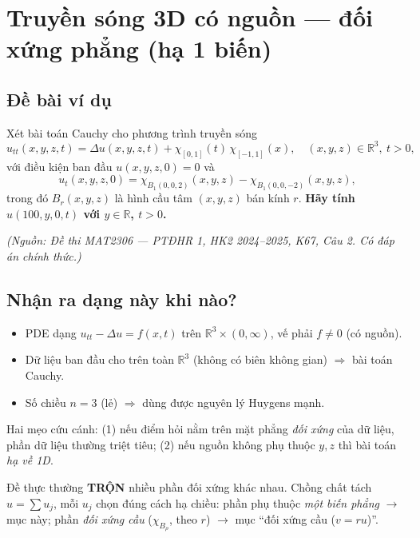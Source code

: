 
\section{Truyền sóng 3D có nguồn --- đối xứng phẳng (hạ 1 biến)}

\subsection*{Đề bài ví dụ}
Xét bài toán Cauchy cho phương trình truyền sóng
\[
  u_{tt}(x,y,z,t) = \Delta u(x,y,z,t) + \chi_{[0,1]}(t)\,\chi_{[-1,1]}(x),
  \quad (x,y,z)\in\mathbb{R}^3,\ t>0,
\]
với điều kiện ban đầu $u(x,y,z,0)=0$ và
\[
  u_t(x,y,z,0) = \chi_{B_1(0,0,2)}(x,y,z) - \chi_{B_1(0,0,-2)}(x,y,z),
\]
trong đó $B_r(x,y,z)$ là hình cầu tâm $(x,y,z)$ bán kính $r$.
\textbf{Hãy tính $u(100,y,0,t)$ với $y\in\mathbb{R}$, $t>0$.}

\emph{\small(Nguồn: Đề thi MAT2306 --- PTĐHR 1, HK2 2024--2025, K67, Câu 2. Có đáp án chính thức.)}

\subsection*{Nhận ra dạng này khi nào?}
\begin{itemize}
  \item PDE dạng $u_{tt}-\Delta u = f(x,t)$ trên $\mathbb{R}^3\times(0,\infty)$, vế phải $f\neq0$ (có nguồn).
  \item Dữ liệu ban đầu cho trên toàn $\mathbb{R}^3$ (không có biên không gian) $\Rightarrow$ bài toán Cauchy.
  \item Số chiều $n=3$ (lẻ) $\Rightarrow$ dùng được nguyên lý Huygens mạnh.
\end{itemize}
\begin{meobox}
Hai mẹo cứu cánh: (1) nếu điểm hỏi nằm trên mặt phẳng \emph{đối xứng} của dữ liệu, phần
dữ liệu thường triệt tiêu; (2) nếu nguồn không phụ thuộc $y,z$ thì bài toán \emph{hạ về 1D}.
\end{meobox}
\begin{luuybox}
Đề thực thường \textbf{TRỘN} nhiều phần đối xứng khác nhau. Chồng chất tách $u=\sum u_j$, mỗi $u_j$
chọn đúng cách hạ chiều: phần phụ thuộc \emph{một biến phẳng} $\to$ mục này; phần \emph{đối xứng cầu}
($\chi_{B_\rho}$, theo $r$) $\to$ mục ``đối xứng cầu ($v=ru$)''.
\end{luuybox}

